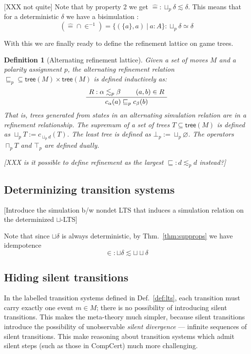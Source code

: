 \documentclass[11pt]{article}
\newcommand{\kw}[1]{{\mathsf{#1}}}
\newtheorem{definition}{Definition}
\begin{document}
[XXX not quite]
Note that by property 2 we get ${\hat{=}} : \sqcup_p \delta \lesssim \delta$.
This means that for a deterministic $\delta$ we have a bisimulation :
\[ ({\hat{=}} \cap {\in^{-1}}) = \{(\{a\}, a) \:|\: a : A \} : \sqcup_p \delta
\simeq \delta \]

With this we are finally ready to define the refinement lattice on game trees.

\begin{definition}[Alternating refinement lattice]
Given a set of moves $M$ and a polarity assignment $p$,
the alternating refinement relation ${\sqsubseteq_p} \subseteq \kw{tree}(M)
\times \kw{tree}(M)$ is defined inductively as:
\[
  \AxiomC{$R : \alpha \lesssim_p \beta$}
  \AxiomC{$(a, b) \in R$}
  \BinaryInfC{$c_\alpha(a) \sqsubseteq_p c_\beta(b)$}
  \DisplayProof
\]
That is, trees generated from states in an alternating simulation relation
are in a refinement relationship.
The supremum of a set of trees $T \subseteq \kw{tree}(M)$
is defined as $\sqcup_p T := c_{\sqcup_p d}(T)$.
The least tree is defined as $\bot_p := \sqcup_p \varnothing$.
The operators $\sqcap_p T$ and $\top_p$ are defined dually.

[XXX is it possible to define refinement as the largest
${\sqsubseteq} : d \lesssim_p d$ instead?]
\end{definition}

\subsection{Determinizing transition systems}

[Introduce the simulation b/w nondet LTS that induces
a simulation relation on the determinized $\sqcup$-LTS]

Note that since $\sqcup \delta$ is always deterministic,
by Thm.~\ref{thm:supprops} we have idempotence
\[ {\in} : {\sqcup \delta} \lesssim {\sqcup}{\sqcup}\delta \]


\subsection{Hiding silent transitions}

In the labelled transition systems defined in Def.~\ref{def:lts},
each transition must carry exactly one event $m \in M$;
there is no possibility of introducing silent transitions.
This makes the meta-theory much simpler,
because silent transitions introduce the possibility of
unobservable \emph{silent divergence} ---
infinite sequences of silent transitions.
This make reasoning about transition systems
which admit silent steps (such as those in CompCert)
much more challenging.
\end{document}
